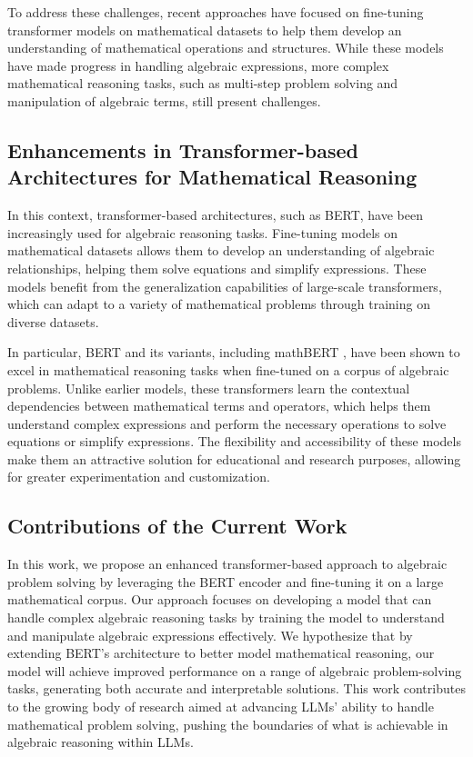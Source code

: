 \documentclass{article}
\begin{document}
To address these challenges, recent approaches have focused on fine-tuning transformer models on mathematical datasets to help them develop an understanding of mathematical operations and structures. While these models have made progress in handling algebraic expressions, more complex mathematical reasoning tasks, such as multi-step problem solving and manipulation of algebraic terms, still present challenges.

\subsection{Enhancements in Transformer-based Architectures for Mathematical Reasoning}

In this context, transformer-based architectures, such as BERT, have been increasingly used for algebraic reasoning tasks. Fine-tuning models on mathematical datasets allows them to develop an understanding of algebraic relationships, helping them solve equations and simplify expressions. These models benefit from the generalization capabilities of large-scale transformers, which can adapt to a variety of mathematical problems through training on diverse datasets.

In particular, BERT and its variants, including mathBERT \cite{mathBERT}, have been shown to excel in mathematical reasoning tasks when fine-tuned on a corpus of algebraic problems. Unlike earlier models, these transformers learn the contextual dependencies between mathematical terms and operators, which helps them understand complex expressions and perform the necessary operations to solve equations or simplify expressions. The flexibility and accessibility of these models make them an attractive solution for educational and research purposes, allowing for greater experimentation and customization.

\subsection{Contributions of the Current Work}

In this work, we propose an enhanced transformer-based approach to algebraic problem solving by leveraging the BERT encoder and fine-tuning it on a large mathematical corpus. Our approach focuses on developing a model that can handle complex algebraic reasoning tasks by training the model to understand and manipulate algebraic expressions effectively. We hypothesize that by extending BERT's architecture to better model mathematical reasoning, our model will achieve improved performance on a range of algebraic problem-solving tasks, generating both accurate and interpretable solutions. This work contributes to the growing body of research aimed at advancing LLMs' ability to handle mathematical problem solving, pushing the boundaries of what is achievable in algebraic reasoning within LLMs.
\end{document}
